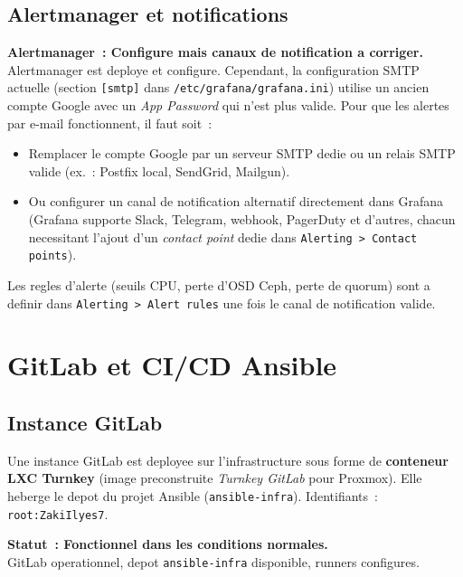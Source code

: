 \documentclass[a4paper,11pt]{article}
\newenvironment{warnbox}{%
  \begin{mdframed}[linecolor=orange,backgroundcolor=orange!8,linewidth=1pt,
    leftmargin=0pt,rightmargin=0pt,innertopmargin=6pt,innerbottommargin=6pt]
}{%
  \end{mdframed}
}
\newenvironment{successbox}{%
  \begin{mdframed}[linecolor=vert,backgroundcolor=vert!7,linewidth=1pt,
    leftmargin=0pt,rightmargin=0pt,innertopmargin=6pt,innerbottommargin=6pt]
}{%
  \end{mdframed}
}
\begin{document}
\subsection{Alertmanager et notifications}

\begin{warnbox}
  \textbf{Alertmanager~: Configure mais canaux de notification a corriger.}\\
  Alertmanager est deploye et configure. Cependant, la configuration SMTP actuelle
  (section \texttt{[smtp]} dans \texttt{/etc/grafana/grafana.ini}) utilise un ancien
  compte Google avec un \textit{App Password} qui n'est plus valide. Pour que les
  alertes par e-mail fonctionnent, il faut soit~:\\[0.3em]
  \begin{itemize}[noitemsep]
    \item Remplacer le compte Google par un serveur SMTP dedie ou un relais SMTP
          valide (ex.~: Postfix local, SendGrid, Mailgun).
    \item Ou configurer un canal de notification alternatif directement dans Grafana
          (Grafana supporte Slack, Telegram, webhook, PagerDuty et d'autres, chacun
          necessitant l'ajout d'un \textit{contact point} dedie dans
          \texttt{Alerting > Contact points}).
  \end{itemize}
  Les regles d'alerte (seuils CPU, perte d'OSD Ceph, perte de quorum) sont a
  definir dans \texttt{Alerting > Alert rules} une fois le canal de notification valide.
\end{warnbox}

\section{GitLab et CI/CD Ansible}

\subsection{Instance GitLab}

Une instance GitLab est deployee sur l'infrastructure sous forme de
\textbf{conteneur LXC Turnkey} (image preconstruite \textit{Turnkey GitLab} pour Proxmox).
Elle heberge le depot du projet Ansible (\texttt{ansible-infra}).
Identifiants~: \texttt{root:ZakiIlyes7}.

\begin{successbox}
  \textbf{Statut~: Fonctionnel dans les conditions normales.}\\
  GitLab operationnel, depot \texttt{ansible-infra} disponible, runners configures.
\end{successbox}
\end{document}
